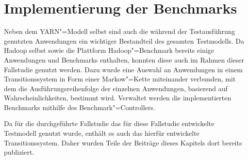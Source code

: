 \chapter{Implementierung der Benchmarks}
\label{ch:benchmarks}

Neben dem YARN"=Modell selbst sind auch die während der Testausführung genutzten Anwendungen ein wichtiger Bestandteil des gesamten Testmodells.
Da Hadoop selbst sowie die Plattform Hadoop"=Benchmark bereits einige Anwendungen und Benchmarks enthalten, konnten diese auch im Rahmen dieser Fallstudie genutzt werden.
Dazu wurde eine Auswahl an Anwendungen in einem Transitionssystem in Form einer Markow"=Kette miteinander verbunden, mit dem die Ausführungsreihenfolge der einzelnen Anwendungen, basierend auf Wahrscheinlichkeiten, bestimmt wird.
Verwaltet werden die implementierten Benchmarks mithilfe des Benchmark"=Controllers.

Da für die durchgeführte Fallstudie \cite{Eberhardinger2018} das für diese Fallstudie entwickelte Testmodell genutzt wurde, enthält es auch das hierfür entwickelte Transitionssystem.
Daher wurden Teile der Beiträge dieses Kapitels dort bereits publiziert.





